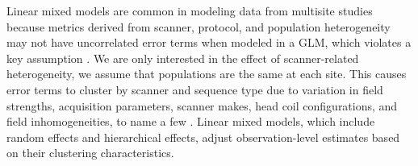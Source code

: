 Linear mixed models are common in modeling data from multisite studies because metrics derived from scanner, protocol, and population heterogeneity may not have uncorrelated error terms when modeled in a GLM, which violates a key assumption \cite{garson2013fundamentals}. We are only interested in the effect of scanner-related heterogeneity, we assume that populations are the same at each site. This causes error terms to cluster by scanner and sequence type due to variation in field strengths, acquisition parameters, scanner makes, head coil configurations, and field inhomogeneities, to name a few \cite{cannon2014}. Linear mixed models, which include random effects and hierarchical effects, adjust observation-level estimates based on their clustering characteristics\cite{garson2013fundamentals}.